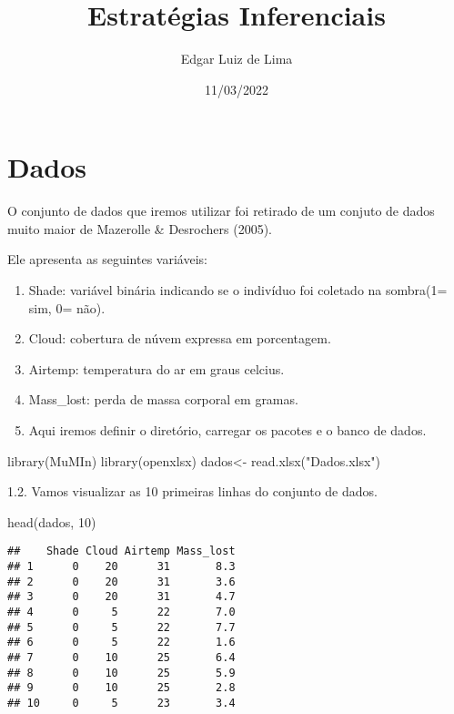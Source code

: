 \documentclass[
]{article}
\title{Estratégias Inferenciais}
\author{Edgar Luiz de Lima}
\date{11/03/2022}
\newenvironment{Shaded}{\begin{snugshade}}{\end{snugshade}}
\newcommand{\DecValTok}[1]{\textcolor[rgb]{0.00,0.00,0.81}{#1}}
\newcommand{\FunctionTok}[1]{\textcolor[rgb]{0.00,0.00,0.00}{#1}}
\newcommand{\NormalTok}[1]{#1}
\newcommand{\OtherTok}[1]{\textcolor[rgb]{0.56,0.35,0.01}{#1}}
\newcommand{\StringTok}[1]{\textcolor[rgb]{0.31,0.60,0.02}{#1}}
\begin{document}
\maketitle

\hypertarget{dados}{%
\section{Dados}\label{dados}}

O conjunto de dados que iremos utilizar foi retirado de um conjuto de
dados muito maior de Mazerolle \& Desrochers (2005).

Ele apresenta as seguintes variáveis:

\begin{enumerate}
\def\labelenumi{\arabic{enumi}.}
\item
  Shade: variável binária indicando se o indivíduo foi coletado na
  sombra(1= sim, 0= não).
\item
  Cloud: cobertura de núvem expressa em porcentagem.
\item
  Airtemp: temperatura do ar em graus celcius.
\item
  Mass\_lost: perda de massa corporal em gramas.
\item
  Aqui iremos definir o diretório, carregar os pacotes e o banco de
  dados.
\end{enumerate}

\begin{Shaded}
\begin{Highlighting}[]
\FunctionTok{library}\NormalTok{(MuMIn)}
\FunctionTok{library}\NormalTok{(openxlsx)}
\NormalTok{dados}\OtherTok{\textless{}{-}} \FunctionTok{read.xlsx}\NormalTok{(}\StringTok{"Dados.xlsx"}\NormalTok{)}
\end{Highlighting}
\end{Shaded}

1.2. Vamos visualizar as 10 primeiras linhas do conjunto de dados.

\begin{Shaded}
\begin{Highlighting}[]
\FunctionTok{head}\NormalTok{(dados, }\DecValTok{10}\NormalTok{)}
\end{Highlighting}
\end{Shaded}

\begin{verbatim}
##    Shade Cloud Airtemp Mass_lost
## 1      0    20      31       8.3
## 2      0    20      31       3.6
## 3      0    20      31       4.7
## 4      0     5      22       7.0
## 5      0     5      22       7.7
## 6      0     5      22       1.6
## 7      0    10      25       6.4
## 8      0    10      25       5.9
## 9      0    10      25       2.8
## 10     0     5      23       3.4
\end{verbatim}
\end{document}
